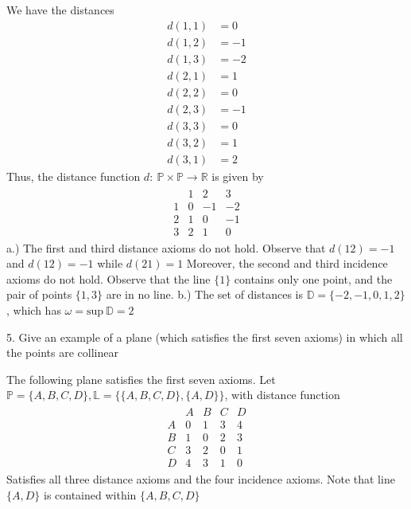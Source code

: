 \documentclass{report}
\begin{document}
    \bigbreak \noindent 
    We have the distances
    \begin{align*}
        d(1,1) &= 0 \\
        d(1,2) &= -1 \\
        d(1,3) &= -2 \\
        d(2,1) &= 1 \\
        d(2,2) &= 0 \\
        d(2,3) &= -1 \\
        d(3,3) &= 0 \\
        d(3,2) &= 1 \\
        d(3,1) &= 2
    \end{align*}
    Thus, the distance function $d:\ \mathbb{P} \times \mathbb{P} \to \mathbb{R}$ is given by 
    \begin{align*}
        \begin{array}{c|ccc}
           &1&2&3 \\
           \hline
            1 & 0 & -1 &  -2\\
            2 & 1 & 0 & - 1\\
            3& 2 & 1 & 0
        \end{array}
    \end{align*}
    \bigbreak \noindent 
    a.) The first and third distance axioms do not hold. Observe that $d(12) = -1$ and $d(12) = -1$ while $d(21) =1$
    \bigbreak \noindent 
    Moreover, the second and third incidence axioms do not hold. Observe that the line $\{1\}$ contains only one point, and the pair of points $\{1,3\} $ are in no line.
    \bigbreak \noindent 
    b.) The set of distances is $\mathbb{D} = \{-2,-1,0,1,2\}$, which has $\omega = \text{sup}\ \mathbb{D} = 2$

    

    \bigbreak \noindent 
    \begin{mdframed}
        5. Give an example of a plane (which satisfies the first seven axioms) in which all the points are collinear
    \end{mdframed}
    \bigbreak \noindent 
    The following plane satisfies the first seven axioms. Let $\mathbb{P} = \{A,B,C,D\}, \mathbb{L} = \{\{A,B,C,D\}, \{A,D\}\}$, with distance function
    \begin{align*}
        \begin{array}{c|cccc}
          &A&B&C&D \\
            A&0&1&3&4 \\
            B& 1&0&2&3\\
            C& 3&2&0&1\\
            D& 4&3&1&0 
       \end{array}
    \end{align*}
    Satisfies all three distance axioms and the four incidence axioms. Note that line $\{A,D\}$ is contained within $\{A,B,C,D\} $
    \pagebreak \bigbreak \noindent
    \begin{figure}[ht]
        \centering
        \label{fig:line2}
    \end{figure}
\end{document}
